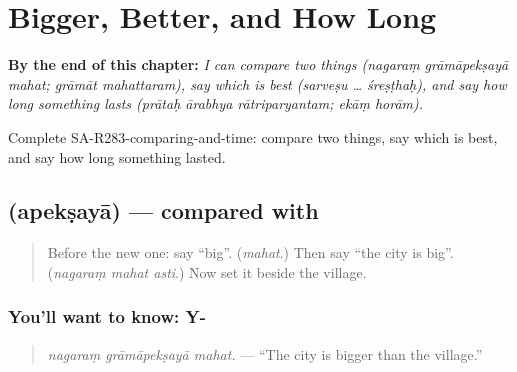
\chapter{Bigger, Better, and How Long}
\label{ch:sa-bigger-better-and-how-long}

\begin{chapteropening}
\textbf{By the end of this chapter:} \emph{I can compare two things (nagaraṃ grāmāpekṣayā mahat; grāmāt mahattaram), say which is best (sarveṣu … śreṣṭhaḥ), and say how long something lasts (prātaḥ ārabhya rātriparyantam; ekāṃ horām).}

Complete SA-R283-comparing-and-time: compare two things, say which is best, and say how long something lasted.
\end{chapteropening}

\section[\texorpdfstring{\sk{अपेक्षया} (apekṣayā)}{अपेक्षया (apekṣayā)}]{ (apekṣayā) — compared with}

\label{lesson:SA-C283-apeksaya}



\begin{quote}
Before the new one: say \textquotedblleft{}big\textquotedblright{}. (\emph{mahat}.) Then say \textquotedblleft{}the city is big\textquotedblright{}. (\emph{nagaraṃ mahat asti}.) Now set it beside the village.
\end{quote}

\subsection*{You'll want to know: Y-}
\begin{quote}
\textbf{  }
\end{quote}

\begin{quote}
\emph{nagaraṃ grāmāpekṣayā mahat.} — \textquotedblleft{}The city is bigger than the village.\textquotedblright{}
\end{quote}

